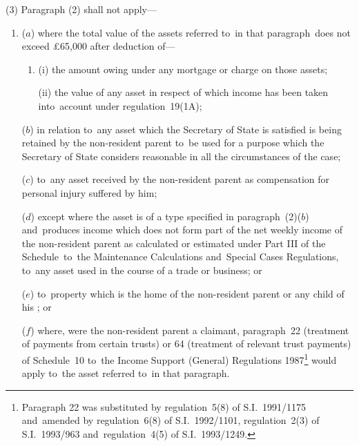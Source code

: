 \documentclass[12pt,a4paper]{article}
\begin{document}
(3) Paragraph (2) shall not apply—
\begin{enumerate}\item[]

($a$) where the total value of the assets referred to~in that paragraph~does not exceed £65,000 after deduction of—
\begin{enumerate}\item[]
(i) the amount owing under any mortgage or charge on those assets;

(ii) the value of any asset in respect of which income has been taken into~account under regulation~19(1A);
\end{enumerate}

($b$) in relation to~any asset which the Secretary of State is satisfied is being retained by the non-resident parent to~be used for a purpose which the Secretary of State considers reasonable in all the circumstances of the case;

($c$) to~any asset received by the non-resident parent as compensation for personal injury suffered by him;

($d$) 
except where the asset is of a type specified in paragraph~(2)($b$)  and~produces income which does not form part of the net weekly income of the non-resident parent as calculated or estimated under Part III of the Schedule~to~the Maintenance Calculations and~Special Cases Regulations,  %
to~any asset used in the course of a trade or business; or

($e$) to~property which is the home of the non-resident parent or any child of his%
%
; or

    ($f$) 
    where, were the non-resident parent a claimant, paragraph~22 (treatment of payments from certain trusts) or 64 (treatment of relevant trust payments) of Schedule~10 to~the Income Support (General) Regulations 1987\footnote{Paragraph 22 was substituted by regulation~5(8) of S.I.\ 1991/1175 and~amended by regulation~6(8) of S.I.\ 1992/1101, regulation~2(3) of S.I.\ 1993/963 and~regulation~4(5) of S.I.\ 1993/1249.} would apply to~the asset referred to~in that paragraph.
\end{enumerate}
\end{document}
